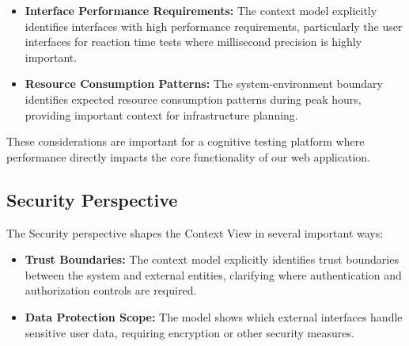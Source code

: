 \begin{itemize}
    \item \textbf{Interface Performance Requirements:} The context model
    explicitly identifies interfaces with high performance requirements,
    particularly the user interfaces for reaction time tests where millisecond
    precision is highly important.



    \item \textbf{Resource Consumption Patterns:} The system-environment
    boundary identifies expected resource consumption patterns during peak
    hours, providing important context for infrastructure planning.
\end{itemize}

These considerations are important for a cognitive testing platform where
performance directly impacts the core functionality of our web application.

\subsection{Security Perspective}

The Security perspective shapes the Context View in several important ways:


\begin{itemize}
    \item \textbf{Trust Boundaries:} The context model explicitly identifies
    trust boundaries between the system and external entities, clarifying where
    authentication and authorization controls are required.

    \item \textbf{Data Protection Scope:} The model shows which external
    interfaces handle sensitive user data, requiring encryption or other
    security measures.


\end{itemize}

